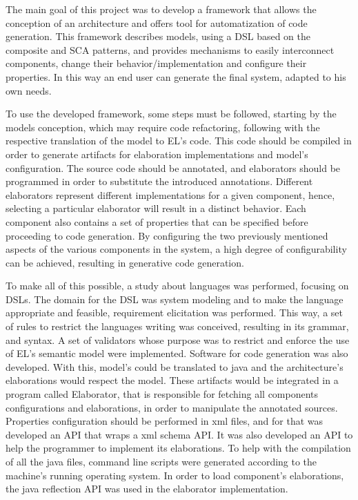
The main goal of this project was to develop a framework that allows the conception of an architecture and offers tool for automatization of code generation. This framework describes models, using a DSL based on the composite and SCA patterns, and provides mechanisms to easily interconnect components, change their behavior/implementation and configure their properties. In this way an end user can generate the final system, adapted to his own needs.

To use the developed framework, some steps must be followed, starting by the models conception, which may require code refactoring, following with the respective translation of the model to EL's code. 
This code should be compiled in order to generate artifacts for elaboration implementations and model's configuration. 
The source code should be annotated, and elaborators should be programmed in order to substitute the introduced annotations.
Different elaborators represent different implementations for a given component, hence, selecting a particular elaborator will result in a distinct behavior. 
Each component also contains a set of properties that can be specified before proceeding to code generation. 
By configuring the two previously mentioned aspects of the various components in the system, a high degree of configurability can be achieved, resulting in generative code generation.

To make all of this possible, a study about languages was performed, focusing on DSLs. 
The domain for the DSL was system modeling and to make the language appropriate and feasible, requirement elicitation was performed. This way, a set of rules to restrict the languages writing was conceived, resulting in its grammar, and syntax.
A set of validators whose purpose was to restrict and enforce the use of EL's semantic model were implemented. 
Software for code generation was also developed. 
With this, model's could be translated to java and the architecture's elaborations would respect the model. 
These artifacts would be integrated in a program called Elaborator, that is responsible for fetching all components configurations and elaborations, in order to manipulate the annotated sources. 
Properties configuration should be performed in xml files, and for that was developed an API that wraps a xml schema API. 
It was also developed an API to help the programmer to implement its elaborations.
To help with the compilation of all the java files, command line scripts were generated according to the machine's running operating system.
In order to load component's elaborations, the java reflection API was used in the elaborator implementation.


